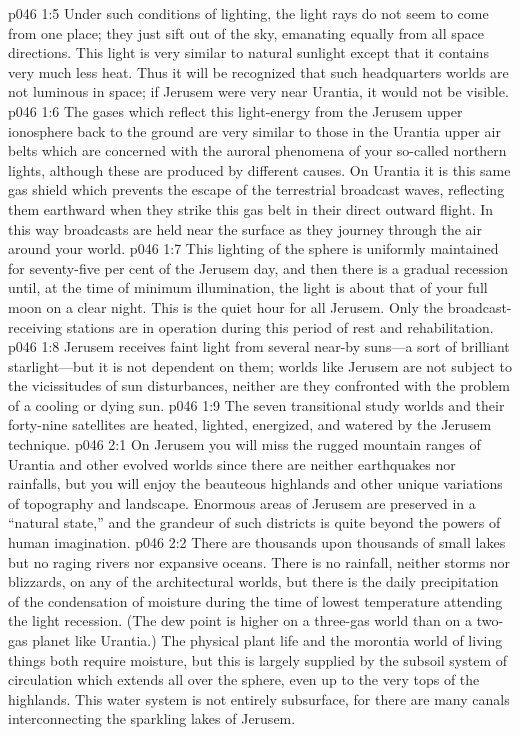 \vs p046 1:5 Under such conditions of lighting, the light rays do not seem to come from one place; they just sift out of the sky, emanating equally from all space directions. This light is very similar to natural sunlight except that it contains very much less heat. Thus it will be recognized that such headquarters worlds are not luminous in space; if Jerusem were very near Urantia, it would not be visible.
\vs p046 1:6 The gases which reflect this light\hyp{}energy from the Jerusem upper ionosphere back to the ground are very similar to those in the Urantia upper air belts which are concerned with the auroral phenomena of your so\hyp{}called northern lights, although these are produced by different causes. On Urantia it is this same gas shield which prevents the escape of the terrestrial broadcast waves, reflecting them earthward when they strike this gas belt in their direct outward flight. In this way broadcasts are held near the surface as they journey through the air around your world.
\vs p046 1:7 This lighting of the sphere is uniformly maintained for seventy\hyp{}five per cent of the Jerusem day, and then there is a gradual recession until, at the time of minimum illumination, the light is about that of your full moon on a clear night. This is the quiet hour for all Jerusem. Only the broadcast\hyp{}receiving stations are in operation during this period of rest and rehabilitation.
\pc \vs p046 1:8 Jerusem receives faint light from several near\hyp{}by suns---a sort of brilliant starlight---but it is not dependent on them; worlds like Jerusem are not subject to the vicissitudes of sun disturbances, neither are they confronted with the problem of a cooling or dying sun.
\vs p046 1:9 The seven transitional study worlds and their forty\hyp{}nine satellites are heated, lighted, energized, and watered by the Jerusem technique.
\vs p046 2:1 On Jerusem you will miss the rugged mountain ranges of Urantia and other evolved worlds since there are neither earthquakes nor rainfalls, but you will enjoy the beauteous highlands and other unique variations of topography and landscape. Enormous areas of Jerusem are preserved in a “natural state,” and the grandeur of such districts is quite beyond the powers of human imagination.
\vs p046 2:2 There are thousands upon thousands of small lakes but no raging rivers nor expansive oceans. There is no rainfall, neither storms nor blizzards, on any of the architectural worlds, but there is the daily precipitation of the condensation of moisture during the time of lowest temperature attending the light recession. (The dew point is higher on a three\hyp{}gas world than on a two\hyp{}gas planet like Urantia.) The physical plant life and the morontia world of living things both require moisture, but this is largely supplied by the subsoil system of circulation which extends all over the sphere, even up to the very tops of the highlands. This water system is not entirely subsurface, for there are many canals interconnecting the sparkling lakes of Jerusem.
